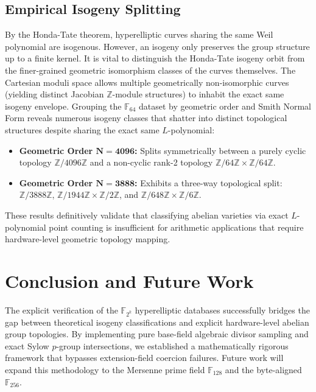 \documentclass[letterpaper, 11pt]{article}
\begin{document}
\subsection{Empirical Isogeny Splitting}
By the Honda-Tate theorem, hyperelliptic curves sharing the same Weil polynomial are isogenous. However, an isogeny only preserves the group structure up to a finite kernel. It is vital to distinguish the Honda-Tate isogeny orbit from the finer-grained geometric isomorphism classes of the curves themselves. The Cartesian moduli space allows multiple geometrically non-isomorphic curves (yielding distinct Jacobian $\mathbb{Z}$-module structures) to inhabit the exact same isogeny envelope. Grouping the $\mathbb{F}_{64}$ dataset by geometric order and Smith Normal Form reveals numerous isogeny classes that shatter into distinct topological structures despite sharing the exact same $L$-polynomial:
\begin{itemize}
    \item \textbf{Geometric Order $\mathbf{N=4096}$:} Splits symmetrically between a purely cyclic topology $\mathbb{Z}/4096\mathbb{Z}$ and a non-cyclic rank-2 topology $\mathbb{Z}/64\mathbb{Z} \times \mathbb{Z}/64\mathbb{Z}$.
    \item \textbf{Geometric Order $\mathbf{N=3888}$:} Exhibits a three-way topological split: $\mathbb{Z}/3888\mathbb{Z}$, $\mathbb{Z}/1944\mathbb{Z} \times \mathbb{Z}/2\mathbb{Z}$, and $\mathbb{Z}/648\mathbb{Z} \times \mathbb{Z}/6\mathbb{Z}$.
\end{itemize}
These results definitively validate that classifying abelian varieties via exact $L$-polynomial point counting is insufficient for arithmetic applications that require hardware-level geometric topology mapping. 

\section{Conclusion and Future Work}
The explicit verification of the $\mathbb{F}_{2^k}$ hyperelliptic databases successfully bridges the gap between theoretical isogeny classifications and explicit hardware-level abelian group topologies. By implementing pure base-field algebraic divisor sampling and exact Sylow $p$-group intersections, we established a mathematically rigorous framework that bypasses extension-field coercion failures. Future work will expand this methodology to the Mersenne prime field $\mathbb{F}_{128}$ and the byte-aligned $\mathbb{F}_{256}$.
\end{document}
